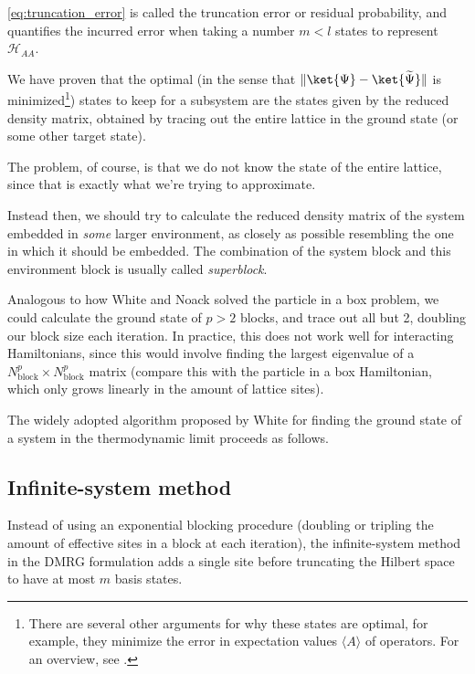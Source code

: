 \autoref{eq:truncation_error} is called the truncation error or residual
probability, and quantifies the incurred error when taking a number $m < l$ states to
represent $\mathcal{H}_{AA}$.

We have proven that the optimal (in the sense that $\Vert \ket{\Psi}
- \ket{\widetilde{\Psi}} \Vert$ is minimized\footnote{There are several other
arguments for why these states are optimal, for example, they minimize the
error in expectation values $\langle A \rangle$ of operators. For an overview,
see \cite{schollwock2005density}.}) states to keep for a subsystem are the
states given by the reduced density matrix, obtained by tracing out the entire
lattice in the ground state (or some other target state).

The problem, of
course, is that we do not know the state of the entire lattice, since that is
exactly what we're trying to approximate.

Instead then, we should try to calculate the reduced density matrix of the
system embedded in \textit{some} larger environment, as closely as possible
resembling the one in which it should be embedded.  The combination of the
system block and this environment block is usually called \textit{superblock}.

Analogous to how White and Noack solved the particle in a box problem, we could
calculate the ground state of $p > 2$ blocks,
and trace out all but 2, doubling our block size each iteration. In
practice, this does not work well for interacting Hamiltonians, since this
would involve finding the largest eigenvalue of a $N_{\text{block}}^p
\times N_{\text{block}}^p$ matrix (compare this with the particle in a box
Hamiltonian, which only grows linearly in the amount of lattice sites).

The widely adopted algorithm proposed by White \cite{white1993density} for
finding the ground state of a system in the thermodynamic limit proceeds
as follows.

\subsection{Infinite-system method}
Instead of using an exponential blocking procedure (doubling or tripling the
amount of effective sites in a block at each iteration), the infinite-system
method in the DMRG formulation adds a single site before truncating the Hilbert
space to have at most $m$ basis states.

